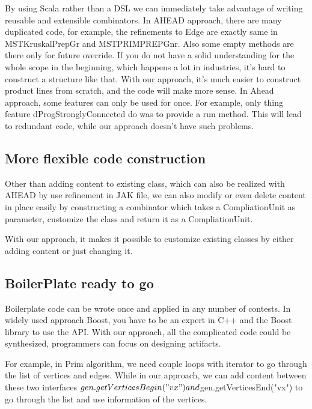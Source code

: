 By using Scala rather than a DSL we can immediately take advantage of writing reusable and extensible combinators.
In AHEAD approach, there are many duplicated code, for example, the refinements to Edge are exactly same in MSTKruskalPrepGr
 and MSTPRIMPREPGnr. Also some empty methods are there only for future override. If you do not have a solid understanding
  for the whole scope in the beginning, which happens a lot in industries, it's hard to construct a structure like that.
  With our approach, it's much easier to construct product lines from scratch, and the code will make more sense.
  In Ahead approach, some features can only be used for once. For example, only thing feature dProgStronglyConnected do
  was to provide a run method. This will lead to redundant code, while our approach doesn't have such problems.

\subsection{More flexible code construction}

 Other than adding content to existing class, which can also be realized with AHEAD by use refinement in JAK file,
 we can also modify or even delete content in place easily by constructing a combinator which takes a CompliationUnit
  as parameter, customize the class and return it as a CompliationUnit.


 With our approach, it makes it possible to customize existing classes by either adding content or just changing it.

\subsection{BoilerPlate ready to go}

Boilerplate code can be wrote once and applied in any number of contests. In widely used approach Boost,
you have to be an expert in C++ and the Boost library to use the API. With our approach, all the complicated code could
be synthesized, programmers can focus on designing artifacts.

For example, in Prim algorithm, we need couple loops with iterator to go through the list of vertices and
 edges. While in our approach, we can add content between these two interfaces
 ${gen.getVerticesBegin("vx")} and ${gen.getVerticesEnd("vx")} to go through the list and use
 information of the vertices.

